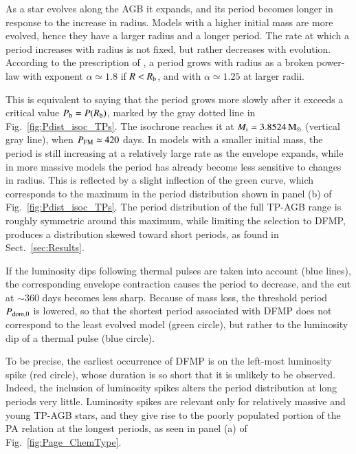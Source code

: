 \documentclass[letter]{aa}
\newcommand{\Msun}{{\rm M}_{\odot}}
\newcommand{\Pdom}{P_{\rm dom,0}}
\newcommand{\Rb}{R_{\rm b}}
\newcommand{\Pb}{P_{\rm b}}
\newcommand{\pfm}{P_{\rm FM}}
\newcommand{\Mini}{M_{\rm i}}
\begin{document}
As a star evolves along the AGB it expands, and its period becomes longer in response to the increase in radius. Models with a higher initial mass are more evolved, hence they have a larger radius and a longer period. The rate at which a period increases with radius is not fixed, but rather decreases with evolution. According to the prescription of \citet{Trabucchi_etal_2021}, a period grows with radius as a broken power-law with exponent $\alpha\simeq1.8$ if $R<\Rb$,  and with $\alpha\simeq1.25$ at larger radii.

This is equivalent to saying that the period grows more slowly after it exceeds a critical value $\Pb=P(\Rb)$, marked by the gray dotted line in Fig.~\ref{fig:Pdist_isoc_TPs}. The isochrone reaches it at $\Mini\simeq3.8524\,\Msun$ (vertical gray line), when $\pfm\simeq420$ days. In models with a smaller initial mass, the period is still increasing at a relatively large rate as the envelope expands, while in more massive models the period has already become less sensitive to changes in radius. This is reflected by a slight inflection of the green curve, which corresponds to the maximum in the period distribution shown in panel (b) of Fig.~\ref{fig:Pdist_isoc_TPs}. The period distribution of the full TP-AGB range is roughly symmetric around this maximum, while limiting the selection to DFMP, produces a distribution skewed toward short periods, as found in Sect.~\ref{sec:Results}.

If the luminosity dips following thermal pulses are taken into account (blue lines), the corresponding envelope contraction causes the period to decrease, and the cut at $\sim360$ days becomes less sharp. Because of mass loss, the threshold period $\Pdom$ is lowered, so that the shortest period associated with DFMP does not correspond to the least evolved model (green circle), but rather to the luminosity dip of a thermal pulse (blue circle).

To be precise, the earliest occurrence of DFMP is on the left-most luminosity spike (red circle), whose duration is so short that it is unlikely to be observed. Indeed, the inclusion of luminosity spikes alters the period distribution at long periods very little. Luminosity spikes are relevant only for relatively massive and young TP-AGB stars, and they give rise to the poorly populated portion of the PA relation at the longest periods, as seen in panel (a) of Fig.~\ref{fig:Page_ChemType}.
\end{document}

